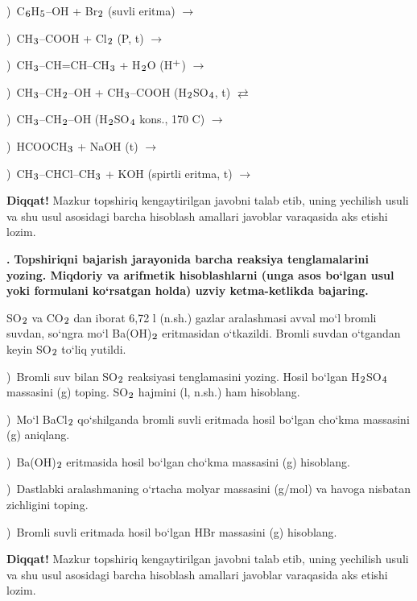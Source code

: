 \documentclass[11pt,a4paper]{article}
\renewcommand{\textsubscript}[1]{\ensuremath{_{\text{\fontsize{8}{8}\selectfont #1}}}}
\renewcommand{\textsuperscript}[1]{\ensuremath{^{\text{\fontsize{8}{8}\selectfont #1}}}}
\newcommand{\qn}[1]{\textbf{\fontsize{11.5}{13}\selectfont #1}}
\newcommand{\qsep}{\par\vspace{13pt}}
\newcommand{\diqqat}[1]{\par\smallskip\noindent\textbf{Diqqat!} #1\par\medskip}
\begin{document}
)\ C\textsubscript{6}H\textsubscript{5}--OH + Br\textsubscript{2} (suvli eritma) $\to$\par
{})\ CH\textsubscript{3}--COOH + Cl\textsubscript{2} (P, t) $\to$\par
{})\ CH\textsubscript{3}--CH=CH--CH\textsubscript{3} + H\textsubscript{2}O (H\textsuperscript{+}) $\to$\par
{})\ CH\textsubscript{3}--CH\textsubscript{2}--OH + CH\textsubscript{3}--COOH (H\textsubscript{2}SO\textsubscript{4}, t) $\rightleftarrows$\par
{})\ CH\textsubscript{3}--CH\textsubscript{2}--OH (H\textsubscript{2}SO\textsubscript{4} kons., 170 \textdegree{}C) $\to$\par
{})\ HCOOCH\textsubscript{3} + NaOH (t) $\to$\par
{})\ CH\textsubscript{3}--CHCl--CH\textsubscript{3} + KOH (spirtli eritma, t) $\to$\par
\diqqat{Mazkur topshiriq kengaytirilgan javobni talab etib, uning yechilish usuli va shu usul asosidagi barcha hisoblash amallari javoblar varaqasida aks etishi lozim.}\qsep
\noindent\qn{43.} \textbf{Topshiriqni bajarish jarayonida barcha reaksiya tenglamalarini yozing. Miqdoriy va arifmetik hisoblashlarni (unga asos bo`lgan usul yoki formulani ko`rsatgan holda) uzviy ketma-ketlikda bajaring.}\par\smallskip
SO\textsubscript{2} va CO\textsubscript{2} dan iborat 6,72 l (n.sh.) gazlar aralashmasi avval mo`l bromli suvdan, so`ngra mo`l Ba(OH)\textsubscript{2} eritmasidan o`tkazildi. Bromli suvdan o`tgandan keyin SO\textsubscript{2} to`liq yutildi.\par
{})\ Bromli suv bilan SO\textsubscript{2} reaksiyasi tenglamasini yozing. Hosil bo`lgan H\textsubscript{2}SO\textsubscript{4} massasini (g) toping. SO\textsubscript{2} hajmini (l, n.sh.) ham hisoblang.\par
{})\ Mo`l BaCl\textsubscript{2} qo`shilganda bromli suvli eritmada hosil bo`lgan cho`kma massasini (g) aniqlang.\par
{})\ Ba(OH)\textsubscript{2} eritmasida hosil bo`lgan cho`kma massasini (g) hisoblang.\par
{})\ Dastlabki aralashmaning o`rtacha molyar massasini (g/mol) va havoga nisbatan zichligini toping.\par
{})\ Bromli suvli eritmada hosil bo`lgan HBr massasini (g) hisoblang.\par
\diqqat{Mazkur topshiriq kengaytirilgan javobni talab etib, uning yechilish usuli va shu usul asosidagi barcha hisoblash amallari javoblar varaqasida aks etishi lozim.}\qsep
\end{document}
